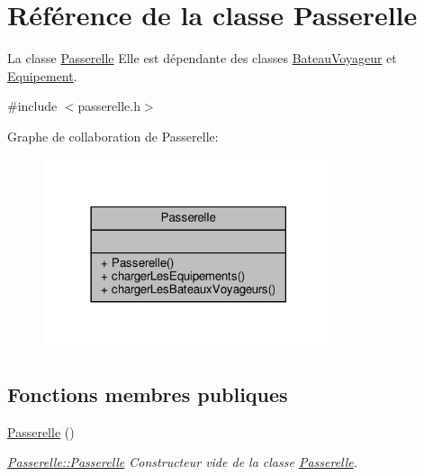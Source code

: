 \hypertarget{class_passerelle}{}\section{Référence de la classe Passerelle}
\label{class_passerelle}


La classe \hyperlink{class_passerelle}{Passerelle} Elle est dépendante des classes \hyperlink{class_bateau_voyageur}{Bateau\+Voyageur} et \hyperlink{class_equipement}{Equipement}.  




{\ttfamily \#include $<$passerelle.\+h$>$}



Graphe de collaboration de Passerelle\+:\nopagebreak
\begin{figure}[H]
\begin{center}
\leavevmode
\includegraphics[width=242pt]{class_passerelle__coll__graph}
\end{center}
\end{figure}
\subsection*{Fonctions membres publiques}
\begin{DoxyCompactItemize}
\item 
\hyperlink{class_passerelle_ab70aa7f8273e11735416362091d6c5f4}{Passerelle} ()
\begin{DoxyCompactList}\small\item\em \hyperlink{class_passerelle_ab70aa7f8273e11735416362091d6c5f4}{Passerelle\+::\+Passerelle} Constructeur vide de la classe \hyperlink{class_passerelle}{Passerelle}. \end{DoxyCompactList}\end{DoxyCompactItemize}
